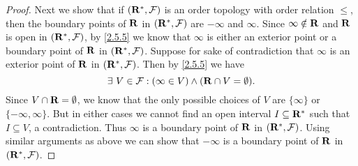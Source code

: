 \begin{proof}
  Next we show that if \((\mathbf{R}^*, \mathcal{F})\) is an order topology with order relation \(\leq\), then the boundary points of \(\mathbf{R}\) in \((\mathbf{R}^*, \mathcal{F})\) are \(-\infty\) and \(\infty\).
  Since \(\infty \notin \mathbf{R}\) and \(\mathbf{R}\) is open in \((\mathbf{R}^*, \mathcal{F})\), by \cref{2.5.5} we know that \(\infty\) is either an exterior point or a boundary point of \(\mathbf{R}\) in \((\mathbf{R}^*, \mathcal{F})\).
  Suppose for sake of contradiction that \(\infty\) is an exterior point of \(\mathbf{R}\) in \((\mathbf{R}^*, \mathcal{F})\).
  Then by \cref{2.5.5} we have
  \[
    \exists\ V \in \mathcal{F} : (\infty \in V) \land (\mathbf{R} \cap V = \emptyset).
  \]
  Since \(V \cap \mathbf{R} = \emptyset\), we know that the only possible choices of \(V\) are \(\{\infty\}\) or \(\{-\infty, \infty\}\).
  But in either cases we cannot find an open interval \(I \subseteq \mathbf{R}^*\) such that \(I \subseteq V\), a contradiction.
  Thus \(\infty\) is a boundary point of \(\mathbf{R}\) in \((\mathbf{R}^*, \mathcal{F})\).
  Using similar arguments as above we can show that \(-\infty\) is a boundary point of \(\mathbf{R}\) in \((\mathbf{R}^*, \mathcal{F})\).


\end{proof}
